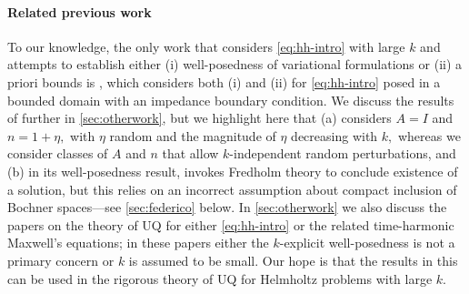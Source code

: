  \paragraph{Related previous work} To our knowledge, the only work that considers \eqref{eq:hh-intro} with large $k$ and attempts to establish either (i) well-posedness of variational formulations or (ii) a priori bounds is \cite{FeLiLo:15}, which considers both (i) and (ii) for \eqref{eq:hh-intro} posed in a bounded domain with an impedance boundary condition. We discuss the results of \cite{FeLiLo:15} further in \cref{sec:otherwork}, but we highlight here that (a) \cite{FeLiLo:15} considers $A=I$ and $n=1+\eta,$ with $\eta$ random and the magnitude of $\eta$ decreasing with $k,$  whereas we consider classes of $A$ and $n$ that allow $k$-independent random perturbations, and (b) in its well-posedness result, \cite{FeLiLo:15}  invokes Fredholm theory to conclude existence of a solution, but this relies on an incorrect assumption about compact inclusion of Bochner spaces---see \cref{sec:federico} below. In \cref{sec:otherwork} we also discuss the papers \cite{BuGh:14,JeSc:16,JeScZe:17,HiScScSc:15,Sc:17,EsJe:19} on the theory of UQ for either \eqref{eq:hh-intro} or the related time-harmonic Maxwell's equations; in these papers either the $k$-explicit well-posedness is not a primary concern or $k$ is assumed to be small. Our hope is that the results in this  can be used in the rigorous theory of UQ for Helmholtz problems with large $k.$
 
